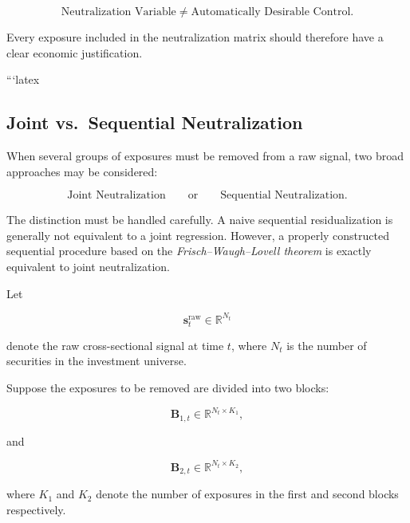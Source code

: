 \documentclass[11pt,a4paper]{article}
\begin{document}
\begin{equation}
\boxed{
\text{Neutralization Variable}
\neq
\text{Automatically Desirable Control}.
}
\end{equation}

Every exposure included in the neutralization matrix should therefore have a
clear economic justification.

```latex
\subsection{Joint vs.\ Sequential Neutralization}
\label{subsec:joint_sequential_neutralization}

When several groups of exposures must be removed from a raw signal, two broad
approaches may be considered:

\begin{equation}
\boxed{
\text{Joint Neutralization}
\qquad\text{or}\qquad
\text{Sequential Neutralization}.
}
\end{equation}

The distinction must be handled carefully. A naive sequential residualization
is generally not equivalent to a joint regression. However, a properly
constructed sequential procedure based on the
\emph{Frisch--Waugh--Lovell theorem} is exactly equivalent to joint
neutralization.

Let

\begin{equation}
\mathbf{s}_t^{\mathrm{raw}}
\in
\mathbb{R}^{N_t}
\end{equation}

denote the raw cross-sectional signal at time $t$, where $N_t$ is the number of
securities in the investment universe.

Suppose the exposures to be removed are divided into two blocks:

\begin{equation}
\mathbf{B}_{1,t}
\in
\mathbb{R}^{N_t\times K_1},
\end{equation}

and

\begin{equation}
\mathbf{B}_{2,t}
\in
\mathbb{R}^{N_t\times K_2},
\end{equation}

where $K_1$ and $K_2$ denote the number of exposures in the first and second
blocks respectively.
\end{document}
